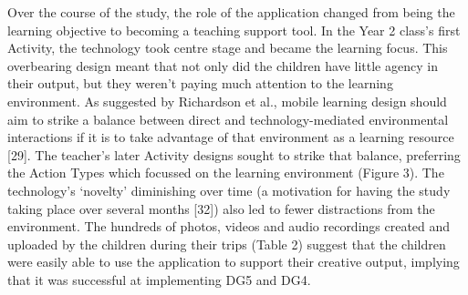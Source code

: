 Over the course of the study, the role of the application changed from being the learning objective to becoming a teaching support tool. In the Year 2 class’s first Activity, the technology took centre stage and became the learning focus. This overbearing design meant that not only did the children have little agency in their output, but they weren’t paying much attention to the learning environment. As suggested by Richardson et al., mobile learning design should aim to strike a balance between direct and technology-mediated environmental interactions if it is to take advantage of that environment as a learning resource [29]. The teacher’s later Activity designs sought to strike that balance, preferring the Action Types which focussed on the learning environment (Figure 3). The technology’s ‘novelty’ diminishing over time (a motivation for having the study taking place over several months [32]) also led to fewer distractions from the environment. The hundreds of photos, videos and audio recordings created and uploaded by the children during their trips (Table 2) suggest that the children were easily able to use the application to support their creative output, implying that it was successful at implementing DG5 and DG4.

